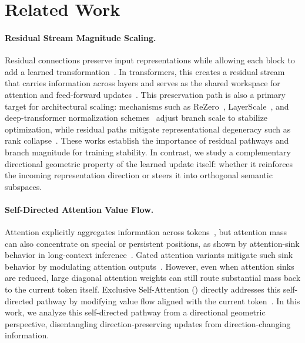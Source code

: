\section{Related Work}
\label{sec:related}


\paragraph{Residual Stream Magnitude Scaling.}
Residual connections preserve input representations while allowing each block
to add a learned transformation~\citep{he2016deep}. In transformers, this creates
a residual stream that carries information across layers and serves as the shared
workspace for attention and feed-forward updates~\citep{elhage2021mathematical}.
This preservation path is also a primary target for architectural scaling:
mechanisms such as ReZero~\citep{Bachlechner2020ReZeroIA}, LayerScale~\citep{touvron2021going},
and deep-transformer normalization schemes~\citep{xiong2020on,Wang2022DeepNetST}
adjust branch scale to stabilize optimization, while residual paths mitigate
representational degeneracy such as rank collapse~\citep{dong2021attention}.
These works establish the importance of residual pathways and branch magnitude
for training stability. In contrast, we study a complementary directional geometric property of the learned update itself: whether it reinforces the incoming representation
direction or steers it into orthogonal semantic subspaces. 

\paragraph{Self-Directed Attention Value Flow.}
Attention explicitly aggregates information across
tokens~\citep{vaswani2017attention}, but attention mass can also concentrate
on special or persistent positions, as shown by attention-sink behavior in
long-context inference~\citep{xiao2023efficient}. Gated attention variants
mitigate such sink behavior by modulating attention
outputs~\citep{qiu2025gatedattention}. However, even when attention sinks are reduced,
large diagonal attention weights can still route substantial mass back to the
current token itself. Exclusive Self-Attention (\xsa{}) directly addresses this
self-directed pathway by modifying value flow aligned with the current
token~\citep{zhai2025xsa}. In this work, we analyze this self-directed pathway from a directional geometric
perspective, disentangling direction-preserving updates from direction-changing
information. 
